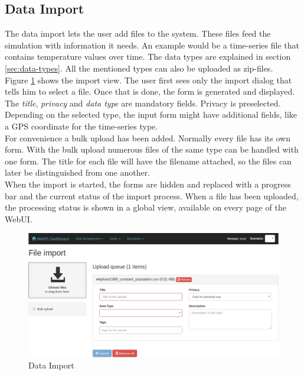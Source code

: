 \subsection{Data Import}
\label{sec:data-import}
The data import lets the user add files to the system. These files feed the simulation with information it needs. An example would be a time-series file that contains temperature values over time. The data types are explained in section \ref{sec:data-types}. All the mentioned types can also be uploaded as zip-files.\\
Figure \ref{fig:data-import-ui} shows the import view. The user first sees only the import dialog that tells him to select a file. Once that is done, the form is generated and displayed. The \textit{title}, \textit{privacy} and \textit{data type} are mandatory fields. Privacy is preselected. Depending on the selected type, the input form might have additional fields, like a GPS coordinate for the time-series type.\\
For convenience a bulk upload has been added. Normally every file has its own form. With the bulk upload numerous files of the same type can be handled with one form. The title for each file will have the filename attached, so the files can later be distinguished from one another.\\
When the import is started, the forms are hidden and replaced with a progress bar and the current status of the import process. When a file has been uploaded, the processing status is shown in a global view, available on every page of the WebUI.
\begin{figure}[H]
	\centering\includegraphics[width=1\textwidth]{res/workflow_data-import}
	\caption{Data Import}
	\label{fig:data-import-ui}
\end{figure}


